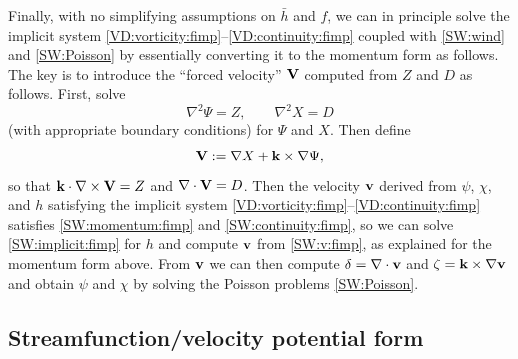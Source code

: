 \documentclass[12pt]{article}
\newcommand{\href}{\bar{h}}
\newcommand{\cross}{\times}
\newcommand{\del}{\nabla}
\begin{document}
\newcommand{\Chi}{X}
Finally, with no simplifying assumptions on $\href$ and $f$, we can in
principle solve the implicit system
\eqref{VD:vorticity:fimp}--\eqref{VD:continuity:fimp} coupled with
\eqref{SW:wind} and \eqref{SW:Poisson} by essentially converting it to the
momentum form as follows.  The key is to introduce the ``forced velocity''
$\mathbf{V}$ computed from $Z$ and $D$ as follows.  First, solve
\begin{equation}
   \del^2\Psi = Z, 
\qquad 
\del^2\Chi = D 
\label{Poisson:forcing}
\end{equation}
(with appropriate boundary conditions) for $\Psi$ and $\Chi$.  Then define
\begin{equation}
   \vecV := \del\Chi + \veck\cross\del\Psi ,
\end{equation}
so that $\veck\cdot\del\cross\vecV = Z$ and $\del\cdot\vecV = D$.
Then the velocity $\mathbf{v}$ derived from $\psi$, $\chi$, and $h$ satisfying the
implicit system \eqref{VD:vorticity:fimp}--\eqref{VD:continuity:fimp}
satisfies \eqref{SW:momentum:fimp} and \eqref{SW:continuity:fimp}, so we can
solve \eqref{SW:implicit:fimp} for $h$ and compute $\mathbf{v}$ from
\eqref{SW:v:fimp}, as explained for the momentum form above.  From
$\mathbf{v}$ we can then compute $\delta=\del\cdot\vecv$ and
$\zeta=\veck\cross\del\vecv$ and obtain $\psi$ and $\chi$ by
solving the Poisson problems \eqref{SW:Poisson}.  

\pagebreak[3]
\subsection{Streamfunction/velocity potential form}
\end{document}
